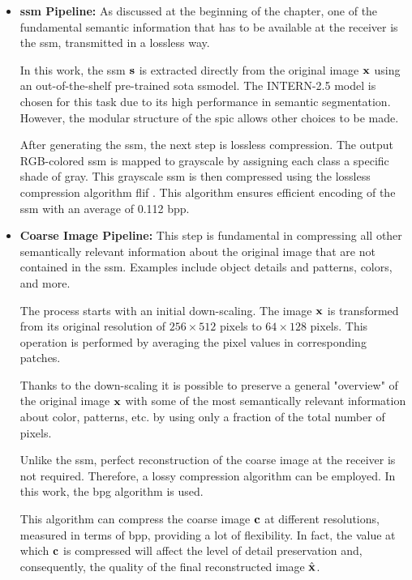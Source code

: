\begin{itemize}[label={}]
    \item \textbf{\gls{ssm} Pipeline:} As discussed at the beginning of the chapter, one of the fundamental semantic information that has to be available at the receiver is the \gls{ssm}, transmitted in a lossless way.

    In this work, the \gls{ssm} $\mathbf{s}$ is extracted directly from the original image $\mathbf{x}$ using an out-of-the-shelf pre-trained \gls{sota} \gls{ssmodel}. The INTERN-2.5 model \cite{Wang2022internimage} is chosen for this task due to its high performance in semantic segmentation. However, the modular structure of the \gls{spic} allows other choices to be made.

    After generating the \gls{ssm}, the next step is lossless compression. The output RGB-colored \gls{ssm} is mapped to grayscale by assigning each class a specific shade of gray. This grayscale \gls{ssm} is then compressed using the lossless compression algorithm \gls{flif} \cite{Sneyers2016FLIF}. This algorithm ensures efficient encoding of the \gls{ssm} with an average of 0.112 \gls{bpp}. \\

    \item \textbf{Coarse Image Pipeline:} This step is fundamental in compressing all other semantically relevant information about the original image that are not contained in the \gls{ssm}. Examples include object details and patterns, colors, and more.

    The process starts with an initial down-scaling. The image $\mathbf{x}$ is transformed from its original resolution of $256 \times 512$ pixels to $64 \times 128$ pixels. This operation is performed by averaging the pixel values in corresponding patches.

    Thanks to the down-scaling it is possible to preserve a general "overview" of the original image $\mathbf{x}$ with some of the most semantically relevant information about color, patterns, etc. by using only a fraction of the total number of pixels.

    Unlike the \gls{ssm}, perfect reconstruction of the coarse image at the receiver is not required. Therefore, a lossy compression algorithm can be employed. In this work, the \gls{bpg} algorithm is used.

    This algorithm can compress the coarse image $\mathbf{c}$ at different resolutions, measured in terms of \gls{bpp}, providing a lot of flexibility. In fact, the value at which $\mathbf{c}$ is compressed will affect the level of detail preservation and, consequently, the quality of the final reconstructed image $\hat{\mathbf{x}}$.
\end{itemize}

